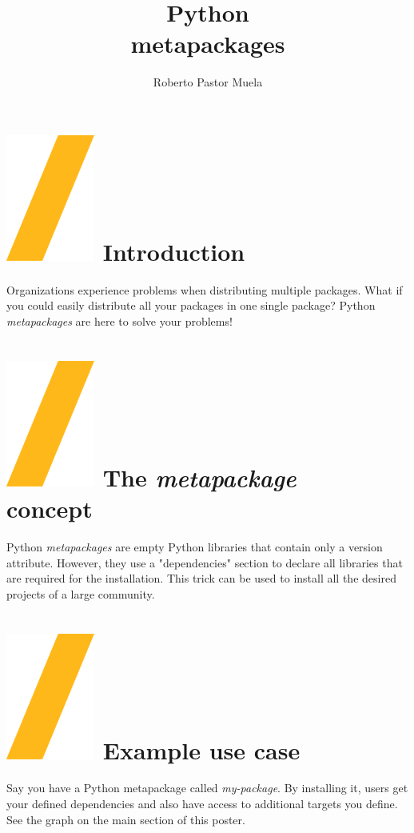 \documentclass[a0paper,fleqn]{src/betterposter}
\begin{document}
{{}

}{

\title{Python \\metapackages}
\author{Roberto Pastor Muela}

\section{\includegraphics[height=\fontcharht\font`\S]{img/general/slash.png} Introduction}
Organizations experience problems when distributing multiple packages. What if you could easily distribute
all your packages in one single package? Python \textit{metapackages} are here to solve your problems!

\section{\includegraphics[height=\fontcharht\font`\S]{img/general/slash.png} The \textit{metapackage}\\concept}
Python \textit{metapackages} are empty Python libraries that contain only a version attribute.
However, they use a "dependencies" section to declare all libraries that are required for the
installation. This trick can be used to install all the desired projects of a large community.

\section{\includegraphics[height=\fontcharht\font`\S]{img/general/slash.png} Example use case}
Say you have a Python metapackage called \textit{my-package}. By installing it, users get your
defined dependencies and also have access to additional targets you define. See the graph on the main
section of this poster.

}
\end{document}
